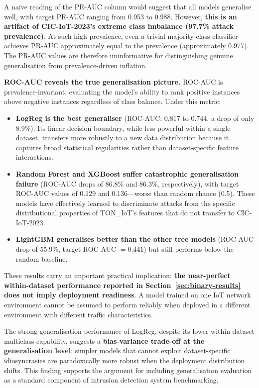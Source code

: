 \documentclass[12pt,a4paper]{report}
\begin{document}
A naive reading of the PR-AUC column would suggest that all models generalise well, with target PR-AUC ranging from 0.953 to 0.988. However, \textbf{this is an artifact of CIC-IoT-2023's extreme class imbalance (97.7\% attack prevalence)}. At such high prevalence, even a trivial majority-class classifier achieves PR-AUC approximately equal to the prevalence (approximately 0.977). The PR-AUC values are therefore uninformative for distinguishing genuine generalisation from prevalence-driven inflation.

\textbf{ROC-AUC reveals the true generalisation picture.} ROC-AUC is prevalence-invariant, evaluating the model's ability to rank positive instances above negative instances regardless of class balance. Under this metric:

\begin{itemize}
  \item \textbf{LogReg is the best generaliser} (ROC-AUC: 0.817 to 0.744, a drop of only 8.9\%). Its linear decision boundary, while less powerful within a single dataset, transfers more robustly to a new data distribution because it captures broad statistical regularities rather than dataset-specific feature interactions.
  \item \textbf{Random Forest and XGBoost suffer catastrophic generalisation failure} (ROC-AUC drops of 86.8\% and 86.3\%, respectively), with target ROC-AUC values of 0.129 and 0.136---worse than random chance (0.5). These models have effectively learned to discriminate attacks from the specific distributional properties of TON\_IoT's features that do not transfer to CIC-IoT-2023.
  \item \textbf{LightGBM generalises better than the other tree models} (ROC-AUC drop of 55.9\%, target ROC-AUC $= 0.441$) but still performs below the random baseline.
\end{itemize}

These results carry an important practical implication: \textbf{the near-perfect within-dataset performance reported in Section~\ref{sec:binary-results} does not imply deployment readiness}. A model trained on one IoT network environment cannot be assumed to perform reliably when deployed in a different environment with different traffic characteristics.

The strong generalisation performance of LogReg, despite its lower within-dataset multiclass capability, suggests a \textbf{bias-variance trade-off at the generalisation level}: simpler models that cannot exploit dataset-specific idiosyncrasies are paradoxically more robust when the deployment distribution shifts. This finding supports the argument for including generalisation evaluation as a standard component of intrusion detection system benchmarking.
\end{document}
